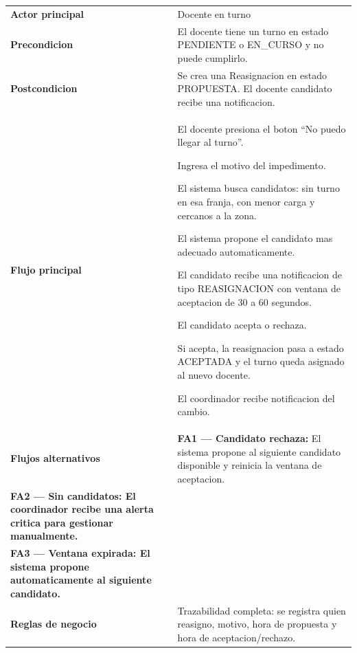 \documentclass[12pt, a4paper]{article}
\newcommand{\cu}[3]{%
  \begin{tcolorbox}[casousostyle, title={#1},
    after title={\hfill\small\normalfont\color{white!80!azulOscuro}#2}]
  \renewcommand{\arraystretch}{1.35}
  \begin{tabularx}{\linewidth}{>{\bfseries\color{azulOscuro}\small}p{3.6cm} X}
  #3
  \end{tabularx}
  \end{tcolorbox}
  \vspace{6pt}
}
\newcommand{\fcu}[2]{\small\textbf{\color{azulOscuro}#1} & \small #2 \\}
\begin{document}
\cu{CU-09 --- Solicitar reasignacion por impedimento}{Docente}{
  \fcu{Actor principal}{Docente en turno}
  \fcu{Precondicion}{El docente tiene un turno en estado PENDIENTE o EN\_CURSO y no puede cumplirlo.}
  \fcu{Postcondicion}{Se crea una Reasignacion en estado PROPUESTA. El docente candidato recibe una notificacion.}
  \fcu{Flujo principal}{
    \begin{pasos}
      \item El docente presiona el boton ``No puedo llegar al turno''.
      \item Ingresa el motivo del impedimento.
      \item El sistema busca candidatos: sin turno en esa franja, con menor carga y cercanos a la zona.
      \item El sistema propone el candidato mas adecuado automaticamente.
      \item El candidato recibe una notificacion de tipo REASIGNACION con ventana de aceptacion de 30 a 60 segundos.
      \item El candidato acepta o rechaza.
      \item Si acepta, la reasignacion pasa a estado ACEPTADA y el turno queda asignado al nuevo docente.
      \item El coordinador recibe notificacion del cambio.
    \end{pasos}
  }
  \fcu{Flujos alternativos}{
    \textbf{FA1 --- Candidato rechaza:} El sistema propone al siguiente candidato disponible y reinicia la ventana de aceptacion.\\[4pt]
    \textbf{FA2 --- Sin candidatos:} El coordinador recibe una alerta critica para gestionar manualmente.\\[4pt]
    \textbf{FA3 --- Ventana expirada:} El sistema propone automaticamente al siguiente candidato.
  }
  \fcu{Reglas de negocio}{Trazabilidad completa: se registra quien reasigno, motivo, hora de propuesta y hora de aceptacion/rechazo.}
}
\end{document}
